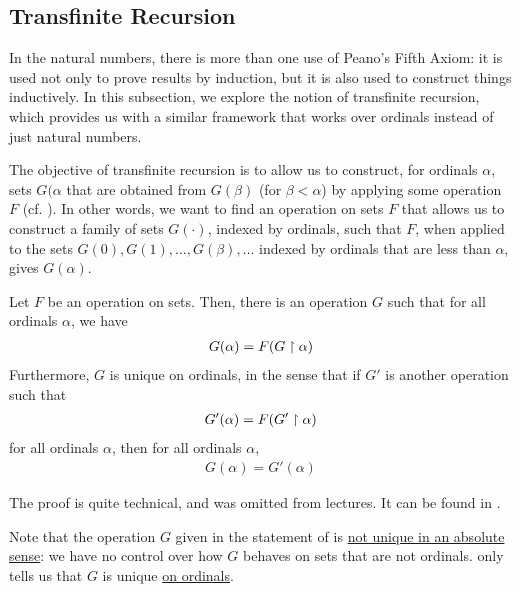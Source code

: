 \subsection{Transfinite Recursion}

In the natural numbers, there is more than one use of Peano's Fifth Axiom: it is used not only to prove results by induction, but it is also used to construct things inductively. In this subsection, we explore the notion of transfinite recursion, which provides us with a similar framework that works over ordinals instead of just natural numbers.

The objective of transfinite recursion is to allow us to construct, for ordinals $\alpha$, sets $G(\alpha$ that are obtained from $G(\beta)$ (for $\beta < \alpha$) by applying some operation $F$ (cf. ). In other words, we want to find an operation on sets $F$ that allows us to construct a family of sets $G(\cdot)$, indexed by ordinals, such that $F$, when applied to the sets $G(0), G(1), \ldots, G(\beta), \ldots$ indexed by ordinals that are less than $\alpha$, gives $G(\alpha)$.



\begin{boxtheorem}\label{Ch3:Thm:Transfinite_Recursion}
    Let $F$ be an operation on sets. Then, there is an operation $G$ such that for all ordinals $\alpha$, we have
    \begin{align*}
        G(\alpha) = F\!\left( G \upharpoonright \alpha \right)
    \end{align*}
    Furthermore, $G$ is unique on ordinals, in the sense that if $G'$ is another operation such that
    \begin{align*}
        G'(\alpha) = F\!\left( G' \upharpoonright \alpha \right)
    \end{align*}
    for all ordinals $\alpha$, then for all ordinals $\alpha$,
    \begin{align*}
        G(\alpha) = G'(\alpha)
    \end{align*}
\end{boxtheorem}

The proof is quite technical, and was omitted from lectures. It can be found in \cite[Appendix A.4]{LecNotes2025}.

Note that the operation $G$ given in the statement of  is \underline{not unique in an absolute sense}: we have no control over how $G$ behaves on sets that are not ordinals.  only tells us that $G$ is unique \underline{on ordinals}.

